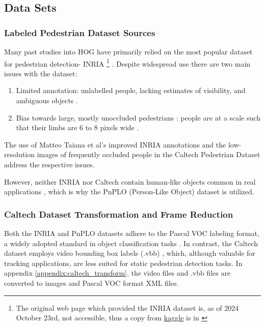\subsection{Data Sets}

\subsubsection{Labeled Pedestrian Dataset Sources}

Many past studies into HOG have primarily \cite{zhou_2021_research} relied on the most popular dataset for pedestrian detection- INRIA \cite{inria_data_copy} \cite{dalal_2005_histograms} \footnote{The original web page which provided the INRIA dataset is, as of 2024 October 23rd, not accessible, thus a copy from \href{kaggle.com}{kaggle} is in \cite{inria_data_copy}} \cite{dollar_2012_pedestrian}. Despite widespread use there are two main issues with the dataset:

\begin{enumerate}
    \item Limited annotation: unlabelled people, lacking estimates of visibility, and ambiguous objects \cite{inria_improved}. 
    \item Bias towards large, mostly unoccluded pedestrians \cite{dollar_2009_pedestrian}: people are at a scale such that their limbs are 6 to 8 pixels wide \cite{dalal_2005_histograms}.
\end{enumerate}

The use of Matteo Taiana et al's improved INRIA annotations \cite{inria_improved} and the low-resolution images of frequently occluded people in the Caltech Pedestrian Dataset \cite{dollar_2009_pedestrian} address the respective issues.

However, neither INRIA nor Caltech contain human-like objects common in real applications \cite{karthika_2020_addressing}, which is why the PnPLO (Person-Like Object) dataset \cite{karthika_2020_addressing} is utilized.

\subsubsection{Caltech Dataset Transformation and Frame Reduction}\label{sec:caltech_trasnform}

Both the INRIA and PnPLO datasets adhere to the Pascal VOC labeling format, a widely adopted standard in object classification tasks \cite{everingham_2009_pascal}. In contrast, the Caltech dataset employs video bounding box labels (.vbb) \cite{mathworks_vbbLabeler}, which, although valuable for tracking applications, are less suited for static pedestrian detection tasks. In appendix \ref{appendix:caltech_transform}, the video files and .vbb files  are converted to images and Pascal VOC format XML files.

